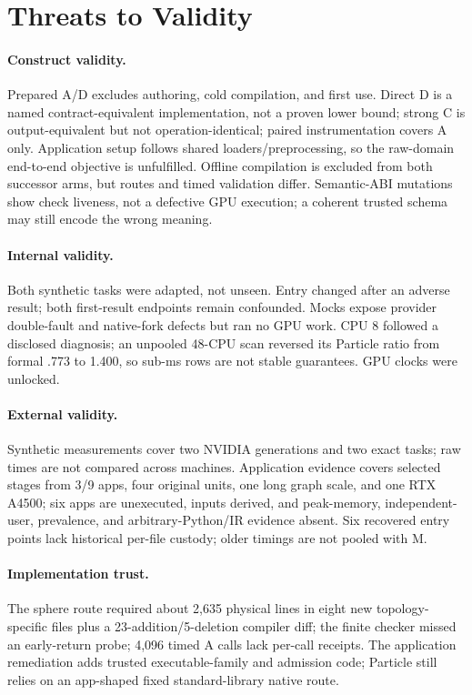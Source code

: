 \documentclass[sigplan,screen,review,anonymous]{acmart}
\begin{document}
\section{Threats to Validity}

\paragraph{Construct validity.}
Prepared A/D excludes authoring, cold compilation, and first use. Direct D is a
named contract-equivalent implementation, not a proven lower bound; strong C is
output-equivalent but not operation-identical; paired instrumentation covers A
only. Application setup follows shared loaders/preprocessing, so the raw-domain
end-to-end objective is unfulfilled. Offline compilation is excluded from both
successor arms, but routes and timed validation differ. Semantic-ABI mutations
show check liveness, not a defective GPU execution; a coherent trusted schema
may still encode the wrong meaning.

\paragraph{Internal validity.}
Both synthetic tasks were adapted, not unseen. Entry changed after an adverse
result; both first-result endpoints remain confounded. Mocks expose provider
double-fault and native-fork defects but ran no GPU work. CPU 8 followed a
disclosed diagnosis; an unpooled 48-CPU scan reversed its Particle ratio from
formal .773 to 1.400, so sub-ms rows are not stable guarantees. GPU clocks were
unlocked.

\paragraph{External validity.}
Synthetic measurements cover two NVIDIA generations and two exact tasks; raw
times are not compared across machines. Application evidence covers selected
stages from 3/9 apps, four original units, one long graph scale, and one RTX
A4500; six apps are unexecuted, inputs derived, and peak-memory,
independent-user, prevalence, and arbitrary-Python/IR evidence absent. Six
recovered entry points lack historical per-file custody; older timings are not
pooled with M.

\paragraph{Implementation trust.}
The sphere route required about 2,635 physical lines in eight new
topology-specific files plus a 23-addition/5-deletion compiler diff; the finite
checker missed an early-return probe; 4,096 timed A calls lack per-call receipts.
The application remediation adds trusted executable-family and admission code;
Particle still relies on an app-shaped fixed standard-library native route.
\end{document}
